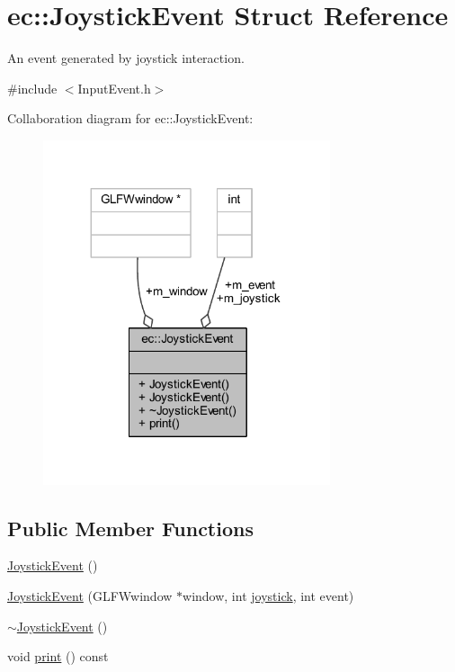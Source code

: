 \hypertarget{structec_1_1_joystick_event}{}\section{ec\+:\+:Joystick\+Event Struct Reference}
\label{structec_1_1_joystick_event}


An event generated by joystick interaction.  




{\ttfamily \#include $<$Input\+Event.\+h$>$}



Collaboration diagram for ec\+:\+:Joystick\+Event\+:\nopagebreak
\begin{figure}[H]
\begin{center}
\leavevmode
\includegraphics[width=239pt]{structec_1_1_joystick_event__coll__graph}
\end{center}
\end{figure}
\subsection*{Public Member Functions}
\begin{DoxyCompactItemize}
\item 
\mbox{\hyperlink{structec_1_1_joystick_event_a04113c84c127415b3937c214b3e6eb92}{Joystick\+Event}} ()
\item 
\mbox{\hyperlink{structec_1_1_joystick_event_ae08b4530293362fa1ecf1446f13e91e7}{Joystick\+Event}} (G\+L\+F\+Wwindow $\ast$window, int \mbox{\hyperlink{namespaceec_a48a4c5a1e957c8419028491291e37634}{joystick}}, int event)
\item 
\mbox{\hyperlink{structec_1_1_joystick_event_a182ea7dcfcd2e363909eb8ea63a41df8}{$\sim$\+Joystick\+Event}} ()
\item 
void \mbox{\hyperlink{structec_1_1_joystick_event_a8fe710e92962e5b7376167deeac260d7}{print}} () const
\end{DoxyCompactItemize}
